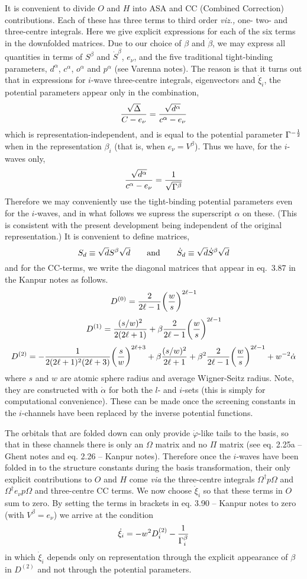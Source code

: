 \vskip 10pt
\nobreak\vskip 5pt\nobreak
It is convenient to divide $O$ and $H$ into ASA and CC (Combined
Correction) contributions.  Each of these has three terms to third order
{\it viz.,} one- two- and three-centre integrals.  Here we give explicit
expressions for each of the six terms in the downfolded matrices.  Due
to our choice of $\beta$ and $\dot\beta$, we may express all quantities
in terms of $S^\beta$ and ${\dot S}^\beta$, $e_\nu$, and the five
traditional tight-binding parameters, $d^\alpha$, $c^\alpha$, $o^\alpha$
and $p^\alpha$ (see Varenna notes).  The reason is that it turns out
that in expressions for $i$-wave three-centre integrals, eigenvectors
and $\dot\xi_i$, the potential parameters
appear only in the combination,
$${{\sqrt\Delta}\over{C-e_\nu}}=
{\sqrt{d^\alpha}\over{c^\alpha-e_\nu}}$$
which is representation-independent,
and is equal to the potential parameter
$\Gamma^{-\scriptstyle{1\over 2}}$
when in the representation $\beta_i$ (that is, when $e_\nu=V^\beta$).
Thus we have, for the $i$-waves only,
$${\sqrt{d^\alpha}\over{c^\alpha-e_\nu}}=
{1\over\sqrt{\Gamma^\beta}}$$
Therefore we may conveniently use the tight-binding potential
parameters even for the $i$-waves, and in
what follows we supress the superscript $\alpha$ on these.
(This is consistent with the present development being independent
of the original representation.) It is convenient to
define matrices,
$$S_d\equiv\sqrt{d}S^\beta\sqrt{d}\qquad{\rm and}\qquad
\dot S_d\equiv\sqrt{d}\dot S^\beta\sqrt{d}$$
and for the
CC-terms, we write the diagonal matrices that appear in eq.~3.87 in the
Kanpur notes as follows.
$$D^{(0)}={2\over{2\ell -1}}\biggl({w\over s}\biggr)^{2\ell -1}$$
$$D^{(1)}={{(s/w)^2}\over{2(2\ell +1)}} + \beta{2\over{2\ell -1}}
  \biggl({w\over s}\biggr)^{2\ell -1}$$
$$D^{(2)}=-{1\over{2(2\ell +1)^2(2\ell +3)}}
  \biggl( {s\over w}\biggr)^{2\ell +3}
  + \beta{(s/w)^2\over {2\ell +1}}
  + \beta^2{2\over{2\ell -1}}\biggl({w\over s}\biggr)^{2\ell -1}
  + w^{-2}\dot\alpha$$
where $s$ and $w$ are atomic sphere radius and average Wigner-Seitz
radius.  Note, they are constructed with $\dot\alpha$ for both the $l$-
and $i$-sets (this is simply for computational convenience).  These can
be made once the screening constants in the $i$-channels have been
replaced by the inverse potential functions.

The orbitals that are folded down can only provide $\dot\varphi$-like
tails to the basis, so that in these channels there is only an
$\Omega$ matrix and no $\Pi$ matrix (see eq. 2.25a -- Ghent notes and
eq. 2.26 -- Kanpur notes). Therefore once the $i$-waves have been folded
in to the structure constants during the basis transformation, their
only explicit contributions to $O$ and $H$ come {\it via} the
three-centre integrals $\Omega^\dagger p \Omega$  and
$\Omega^\dagger e_\nu p \Omega$  and three-centre CC terms.
We now choose $\dot\xi_i$ so that these terms in $O$ sum to zero.
By setting the terms in brackets in eq. 3.90 -- Kanpur notes to zero
(with $V^\beta=e_\nu$) we arrive at the condition
$$\dot\xi_i =-w^2 D^{(2)}_i - {1\over\Gamma^\beta_i}$$
in which $\dot\xi_i$ depends only
on representation through the explicit
appearance of $\beta$ in $D^{(2)}$ and not through the potential
parameters.

